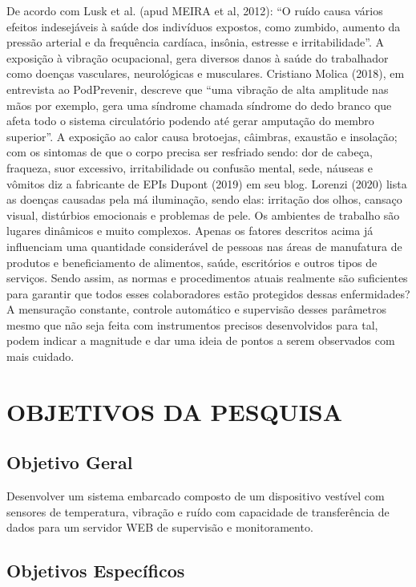 De acordo com Lusk et al. (apud MEIRA et al, 2012): “O ruído causa vários efeitos indesejáveis à saúde dos indivíduos expostos, como zumbido, aumento da pressão arterial e da frequência cardíaca, insônia, estresse e irritabilidade”.
A exposição à vibração ocupacional, gera diversos danos à saúde do trabalhador como doenças vasculares, neurológicas e musculares. Cristiano Molica (2018), em entrevista ao PodPrevenir, descreve que “uma vibração de alta amplitude nas mãos por exemplo, gera uma síndrome chamada síndrome do dedo branco que afeta todo o sistema circulatório podendo até gerar amputação do membro superior”. 
A exposição ao calor causa brotoejas, câimbras, exaustão e insolação; com os sintomas de que o corpo precisa ser resfriado sendo: dor de cabeça, fraqueza, suor excessivo, irritabilidade ou confusão mental, sede, náuseas e vômitos diz a fabricante de EPIs Dupont (2019) em seu blog.
Lorenzi (2020) lista as doenças causadas pela má iluminação, sendo elas: irritação dos olhos, cansaço visual, distúrbios emocionais e problemas de pele.
Os ambientes de trabalho são lugares dinâmicos e muito complexos. Apenas os fatores descritos acima já influenciam uma quantidade considerável de pessoas nas áreas de manufatura de produtos e beneficiamento de alimentos, saúde, escritórios e outros tipos de serviços. Sendo assim, as normas e procedimentos atuais realmente são suficientes para garantir que todos esses colaboradores estão protegidos dessas enfermidades?
A mensuração constante, controle automático e supervisão desses parâmetros mesmo que não seja feita com instrumentos precisos desenvolvidos para tal, podem indicar a magnitude e dar uma ideia de pontos a serem observados com mais cuidado.

\section{OBJETIVOS DA PESQUISA}
\label{sec: objetivosDaPesquisa}

\subsection{Objetivo Geral}
\label{sec: objetivoGeral}

Desenvolver um sistema embarcado composto de um dispositivo vestível com sensores de temperatura, vibração e ruído com capacidade de transferência de dados para um servidor WEB de supervisão e monitoramento. 

\subsection{Objetivos Específicos}
\label{sec: objetivoEspecificos}


